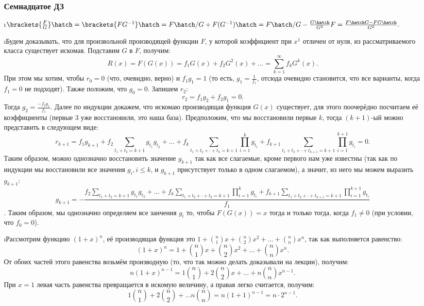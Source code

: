 \subsubsection{Семнадцатое ДЗ}

\i $\brackets{\frac{F}{G}}\hatch = \brackets{FG^{-1}}\hatch = F\hatch/G + F(G^{-1})\hatch = F\hatch/G -\frac{G\hatch}{G^2}F = \frac{F\hatch G - FG\hatch}{G^2}.$

\i Будем доказывать, что для произвольной производящей функции $F$, у которой коэффициент при $x^1$ отличен от нуля, из рассматриваемого класса существует искомая. Подставим $G$ в $F$, получим:
$$R(x) = F(G(x)) = f_1G(x) + f_2G^2(x) + \ldots = \sum_{k=1}^{\infty} f_kG^k(x).$$
При этом мы хотим, чтобы $r_0 = 0$ (что, очевидно, верно) и $f_1 g_1 = 1$ (то есть, $g_1 = \frac{1}{f_1}$, отсюда очевидно становится, что все варианты, когда $f_1 = 0$ не подходят). Также положим, что $g_0 = 0$. Запишем $r_2$:
$$r_2 = f_1 g_2 + f_2 g_1 = 0.$$
Тогда $g_2 = \frac{-f_2 g_1}{f_1}$. Далее по индукции докажем, что искомаю производящая функция $G(x)$ существует, для этого поочерёдно посчитаем её коэффициенты (первые 3 уже восстановили, это наша база). Предположим, что мы восстановили первые $k$, тогда $(k+1)$-ый можно представить в следующем виде:
$$r_{k+1} = f_1 g_{k+1} + f_2\sum_{t_1 + t_2 = k+1}g_{t_1}g_{t_2} + \ldots + f_k\sum_{t_1 + t_2 + \cdot + t_k = k+1} \prod_{i = 1}^{k} g_{t_i} + f_{k+1}\sum_{t_1 + t_2 + \cdot + t_{k+1} = k+1} \prod_{i = 1}^{k+1} g_{t_i} = 0.$$
Таким образом, можно однозначно восстановить значение $g_{k+1}$ так как все слагаемые, кроме первого нам уже известны (так как по индукции мы восстановили все значения $g_i, i \leq k$, и $g_{k+1}$ присутствует только в одном слагаемом), а значит, из него мы можем выразить $g_{k+1}$:
$$g_{k+1} = -\frac{f_2\displaystyle\sum_{t_1 + t_2 = k+1}g_{t_1}g_{t_2} + \ldots + f_k\sum_{t_1 + t_2 + \cdot + t_k = k+1} \prod_{i = 1}^{k} g_{t_i} + f_{k+1}\sum_{t_1 + t_2 + \cdot + t_{k+1} = k+1} \prod_{i = 1}^{k+1} g_{t_i}}{f_1}$$.
Таким образом, мы однозначно определяем все занчения $g_i$ то, чтобы $F(G(x)) = x$ тогда и только тогда, когда $f_1 \ne 0$ (при условии, что $f_0 = 0$).

\i Рассмотрим функцию $(1+x)^n$, её производящая функция это $1 + \binom{n}{1}x + \binom{n}{2}x^2 + \ldots + \binom{n}{n}x^n$, так как выполняется равенство:
$$(1+x)^n = 1 + \binom{n}{1}x + \binom{n}{2}x^2 + \ldots + \binom{n}{n}x^n.$$
От обоих частей этого равенства возьмём производную (то, что так можно делать доказывали на лекции), получим:
$$n(1+x)^{n-1} = 1\binom{n}{1} + 2\binom{n}{2}x + \ldots + n\binom{n}{n}x^{n-1}.$$
При $x = 1$ левая часть равенства превращается в искомую величину, а правая легко считается, получим:
$$1\binom{n}{1} + 2\binom{n}{2} + \ldots n\binom{n}{n} = n(1+1)^{n-1} = n\cdot 2^{n-1}.$$

